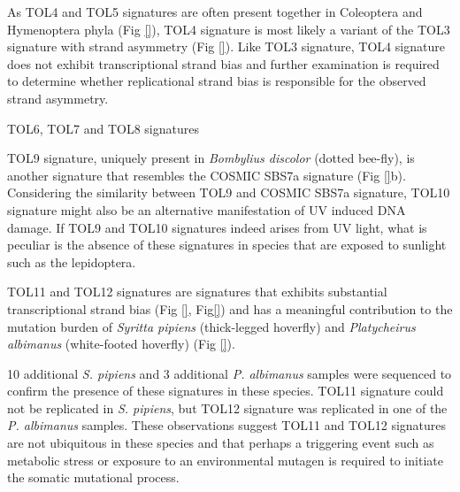 
As TOL4 and TOL5 signatures are often present together in Coleoptera and Hymenoptera phyla (Fig \ref{}), TOL4 signature is most likely a variant of the TOL3 signature with strand asymmetry (Fig \ref{}). Like TOL3 signature, TOL4 signature does not exhibit transcriptional strand bias and further examination is required to determine whether replicational strand bias is responsible for the observed strand asymmetry. 

TOL6, TOL7 and TOL8 signatures 


TOL9 signature, uniquely present in \textit{Bombylius discolor} (dotted bee-fly), is another signature that resembles the COSMIC SBS7a signature (Fig \ref{}b). Considering the similarity between TOL9 and COSMIC SBS7a signature, TOL10 signature might also be an alternative manifestation of UV induced DNA damage. If TOL9 and TOL10 signatures indeed arises from UV light, what is peculiar is the absence of these signatures in species that are exposed to sunlight such as the lepidoptera. 



TOL11 and TOL12 signatures are signatures that exhibits substantial transcriptional strand bias (Fig \ref{}, Fig\ref{}) and has a meaningful contribution to the mutation burden of \textit{Syritta pipiens} (thick-legged hoverfly) and \textit{Platycheirus albimanus} (white-footed hoverfly) (Fig \ref{}). 


10 additional \textit{S. pipiens} and 3 additional \textit{P. albimanus} samples were sequenced to confirm the presence of these signatures in these species. TOL11 signature could not be replicated in \textit{S. pipiens}, but TOL12 signature was replicated in one of the \textit{P. albimanus} samples. These observations suggest TOL11 and TOL12 signatures are not ubiquitous in these species and that perhaps a triggering event such as metabolic stress or exposure to an environmental mutagen is required to initiate the somatic mutational process. 



